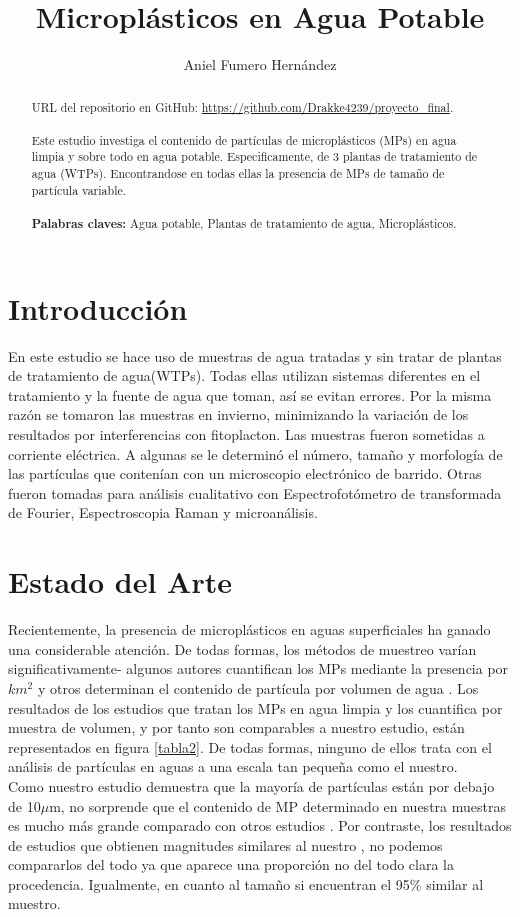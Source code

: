 \documentclass[a4paper,11pt]{article}
\title{Microplásticos en Agua Potable}
\author{Aniel Fumero Hernández}
\begin{document}
\maketitle
	\begin{abstract}
	
	URL del repositorio en GitHub:  \href{https://github.com/Drakke4239/proyecto\_final}{https://github.com/Drakke4239/proyecto\_final}.\\
	\\Este estudio investiga el contenido de partículas de microplásticos (MPs) en agua limpia y sobre todo en agua potable. Especificamente, de 3 plantas de tratamiento de agua (WTPs). Encontrandose en todas ellas la presencia de MPs de tamaño de partícula variable.\\\\
	\textbf{Palabras claves:} Agua potable, Plantas de tratamiento de agua, Microplásticos.
	
	\end{abstract}
\tableofcontents
\section{Introducción}
En este estudio se hace uso de muestras de agua tratadas y sin tratar de plantas de tratamiento de agua(WTPs). Todas ellas utilizan sistemas diferentes en el tratamiento y la fuente de agua que toman, así se evitan errores. Por la misma razón se tomaron las muestras en invierno, minimizando la variación de los resultados por interferencias con fitoplacton.
Las muestras fueron sometidas a corriente eléctrica. A algunas se le determinó el número, tamaño y morfología de las partículas que contenían con un microscopio electrónico de barrido. Otras fueron tomadas para análisis cualitativo con Espectrofotómetro de transformada de Fourier, Espectroscopia Raman y microanálisis.
\section{Estado del Arte}
	Recientemente, la presencia de microplásticos en aguas superficiales ha ganado una considerable atención. De todas formas, los métodos de muestreo varían significativamente- algunos autores cuantifican los MPs mediante la presencia por $km^{2}$ \cite{Su2016} y otros determinan el contenido de partícula por volumen de agua \cite{Di2018}. Los resultados de los estudios que tratan los MPs en agua limpia y los cuantifica por muestra de volumen, y por tanto son comparables a nuestro estudio, están representados en figura \ref{tabla2}. De todas formas, ninguno de ellos trata con el análisis de partículas en aguas a una escala tan pequeña como el nuestro. \\
	Como nuestro estudio demuestra que la mayoría de partículas están por debajo de 10$\mu$m, no sorprende que el contenido de MP determinado en nuestra muestras es mucho más grande comparado con otros estudios \cite{Su2016}. Por contraste, los resultados de estudios que obtienen magnitudes similares al nuestro \cite{Osmann2018}, no podemos compararlos del todo ya que aparece una proporción no del todo clara la procedencia. Igualmente, en cuanto al tamaño si encuentran el 95\% similar al muestro.
	
\end{document}
